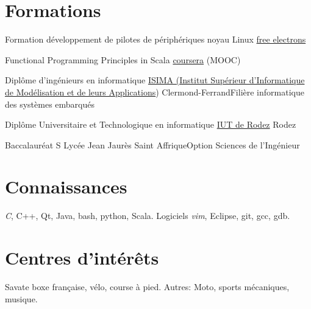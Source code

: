 \documentclass[10pt,a4paper,sans]{moderncv}
\begin{document}
\section{Formations}
	{Formation développement de pilotes de périphériques noyau Linux}
	{\href{http://free-electrons.com/}{free electrons}}
	{}{}{}
	
	{Functional Programming Principles in Scala}
	{\href{https://fr.coursera.org/course/progfun}{coursera}}
	{(MOOC)}{}{}

	{Diplôme d’ingénieurs en informatique}
	{\href{http://www.isima.fr/}{ISIMA (Institut Supérieur d’Informatique de Modélisation et de leurs Applications})}
	{Clermond-Ferrand}{Filière informatique des systèmes embarqués}{}

	{Diplôme Universitaire et Technologique en informatique}
	{\href{http://www.iut-rodez.fr/}{IUT de Rodez}}
	{Rodez}{}{}

	{Baccalauréat S}
	{Lycée Jean Jaurès}
	{Saint Affrique}{Option Sciences de l'Ingénieur}{}


\section{Connaissances}
								{\emph{C}, C++, Qt, Java, bash, python, Scala.}
						 {Logiciels}
								{\emph{vim}, Eclipse, git, gcc, gdb.}


	
						
\section{Centres d'intérêts}
{Savate boxe française, vélo, course à pied.}
{Autres:}
{Moto, sports mécaniques, musique.}
\end{document}
